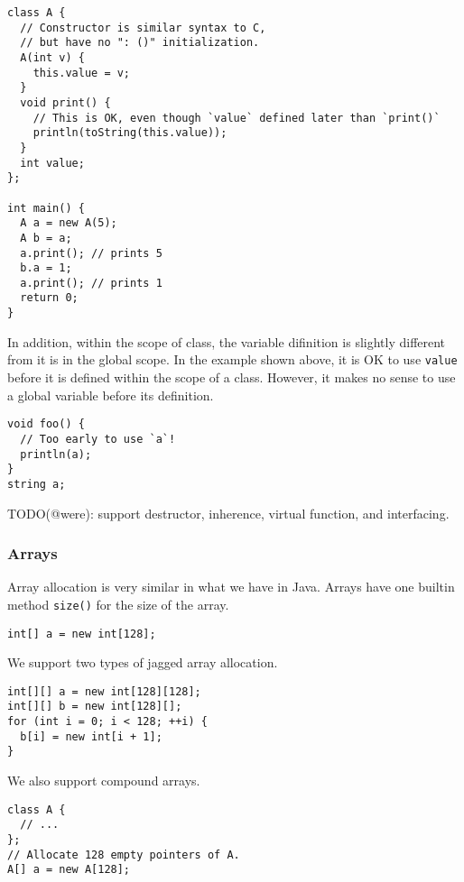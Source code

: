 \documentclass{article}
\begin{document}
\begin{lstlisting}[caption=Class definition\label{code:class}]
class A {
  // Constructor is similar syntax to C,
  // but have no ": ()" initialization.
  A(int v) {
    this.value = v;
  }
  void print() {
    // This is OK, even though `value` defined later than `print()`
    println(toString(this.value));
  }
  int value;
};

int main() {
  A a = new A(5);
  A b = a;
  a.print(); // prints 5
  b.a = 1;
  a.print(); // prints 1
  return 0;
}
\end{lstlisting}

\noindent In addition, within the scope of class,
the variable difinition is slightly different
from it is in the global scope. In the example shown above,
it is OK to use \texttt{value} before it is defined within
the scope of a class. However, it makes no sense to use a global
variable before its definition.

\begin{lstlisting}[caption=An example of scoping\label{code:too-early}]
void foo() {
  // Too early to use `a`!
  println(a);
}
string a;
\end{lstlisting}

TODO(@were): support destructor, inherence, virtual function, and interfacing.

\subsubsection{Arrays}

Array allocation is very similar in what we have in Java.
Arrays have one builtin method \texttt{size()} for the size of the array.

\begin{lstlisting}[caption=1-D Array Allocation]
int[] a = new int[128];
\end{lstlisting}

We support two types of jagged array allocation.
\begin{lstlisting}[caption=1-D Array Allocation]
int[][] a = new int[128][128];
int[][] b = new int[128][];
for (int i = 0; i < 128; ++i) {
  b[i] = new int[i + 1];
}
\end{lstlisting}

We also support compound arrays.
\begin{lstlisting}[caption=1-D Array Allocation]
class A {
  // ...
};
// Allocate 128 empty pointers of A.
A[] a = new A[128];
\end{lstlisting}
\end{document}
